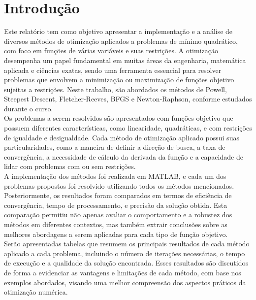 \documentclass[a4paper, 12pt]{article}
\begin{document}
\newpage


\newpage

\listoffigures
\thispagestyle{empty}

\newpage

\newpage

\thispagestyle{empty}

\newpage

\section*{Introdução}

Este relatório tem como objetivo apresentar a implementação e a análise de diversos métodos de otimização aplicados a problemas de mínimo quadrático, com foco em funções de várias variáveis e suas restrições. A otimização desempenha um papel fundamental em muitas áreas da engenharia, matemática aplicada e ciências exatas, sendo uma ferramenta essencial para resolver problemas que envolvem a minimização ou maximização de funções objetivo sujeitas a restrições. Neste trabalho, são abordados os métodos de Powell, Steepest Descent, Fletcher-Reeves, BFGS e Newton-Raphson, conforme estudados durante o curso.\\

Os problemas a serem resolvidos são apresentados com funções objetivo que possuem diferentes características, como linearidade, quadráticas, e com restrições de igualdade e desigualdade. Cada método de otimização aplicado possui suas particularidades, como a maneira de definir a direção de busca, a taxa de convergência, a necessidade de cálculo da derivada da função e a capacidade de lidar com problemas com ou sem restrições.\\

A implementação dos métodos foi realizada em MATLAB, e cada um dos problemas propostos foi resolvido utilizando todos os métodos mencionados. Posteriormente, os resultados foram comparados em termos de eficiência de convergência, tempo de processamento, e precisão da solução obtida. Esta comparação permitiu não apenas avaliar o comportamento e a robustez dos métodos em diferentes contextos, mas também extrair conclusões sobre as melhores abordagens a serem aplicadas para cada tipo de função objetivo.\\

Serão apresentadas tabelas que resumem os principais resultados de cada método aplicado a cada problema, incluindo o número de iterações necessárias, o tempo de execução e a qualidade da solução encontrada. Esses resultados são discutidos de forma a evidenciar as vantagens e limitações de cada método, com base nos exemplos abordados, visando uma melhor compreensão dos aspectos práticos da otimização numérica.\\
\end{document}
